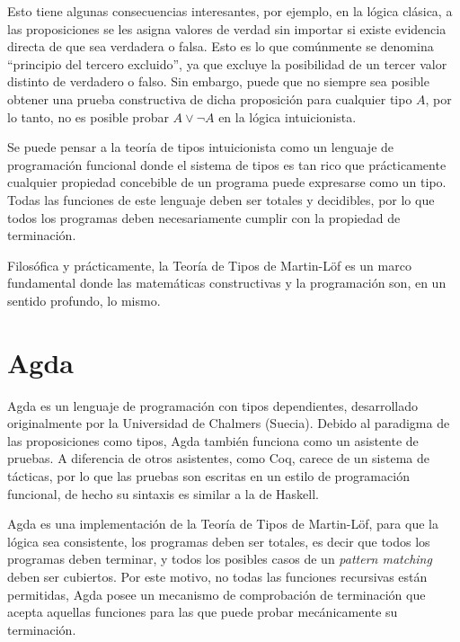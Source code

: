 Esto tiene algunas consecuencias interesantes, por ejemplo, en la lógica clásica, a las proposiciones se les asigna valores de verdad sin importar si existe evidencia directa de que sea verdadera o falsa.
Esto es lo que comúnmente se denomina ``principio del tercero excluido'', ya que excluye la posibilidad de un tercer valor distinto de verdadero o falso.
Sin embargo, puede que no siempre sea posible obtener una prueba constructiva de dicha proposición para cualquier tipo $A$, por lo tanto, no es posible probar $A \vee \neg A$ en la lógica intuicionista.


Se puede pensar a la teoría de tipos intuicionista como un lenguaje de programación funcional donde el sistema de tipos es tan rico que prácticamente cualquier propiedad concebible de un programa puede expresarse como un tipo.
Todas las funciones de este lenguaje deben ser totales y decidibles, por lo que todos los programas deben necesariamente cumplir con la propiedad de terminación.

Filosófica y prácticamente, la Teoría de Tipos de Martin-Löf es un marco fundamental donde las matemáticas constructivas y la programación son, en un sentido profundo, lo mismo.


\section{Agda}
Agda es un lenguaje de programación con tipos dependientes, desarrollado originalmente por la Universidad de Chalmers (Suecia).
Debido al paradigma de las proposiciones como tipos, Agda también funciona como un asistente de pruebas.
A diferencia de otros asistentes, como Coq, carece de un sistema de tácticas, por lo que las pruebas son escritas en un estilo de programación funcional, de hecho su sintaxis es similar a la de Haskell.

Agda es una implementación de la Teoría de Tipos de Martin-Löf, para que la lógica sea consistente, los programas deben ser totales, es decir que todos los programas deben terminar, y todos los posibles casos de un \textit{pattern matching} deben ser cubiertos.
Por este motivo, no todas las funciones recursivas están permitidas, Agda posee un mecanismo de comprobación de terminación que acepta aquellas funciones para las que puede probar mecánicamente su terminación.


